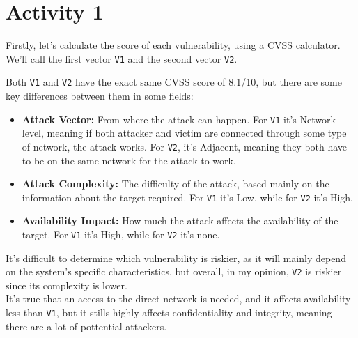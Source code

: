 \section*{Activity 1}

Firstly, let's calculate the score of each vulnerability, using a CVSS calculator. We'll call the first vector \texttt{V1} and the second vector \texttt{V2}.


Both \texttt{V1} and \texttt{V2} have the exact same CVSS score of 8.1/10, but there are some key differences between them in some fields:
\begin{itemize}
    \item \textbf{Attack Vector:} From where the attack can happen. For \texttt{V1} it's Network level, meaning if both attacker and victim are connected through some type of network, the attack works. For \texttt{V2}, it's Adjacent, meaning they both have to be on the same network for the attack to work.
    \item \textbf{Attack Complexity:} The difficulty of the attack, based mainly on the information about the target required. For \texttt{V1} it's Low, while for \texttt{V2} it's High.
    \item \textbf{Availability Impact:} How much the attack affects the availability of the target. For \texttt{V1} it's High, while for \texttt{V2} it's none.
\end{itemize}

It's difficult to determine which vulnerability is riskier, as it will mainly depend on the system's specific characteristics, but overall, in my opinion, \texttt{V2} is riskier since its complexity is lower.\\
It's true that an access to the direct network is needed, and it affects availability less than \texttt{V1}, but it stills highly affects confidentiality and integrity, meaning there are a lot of pottential attackers.

